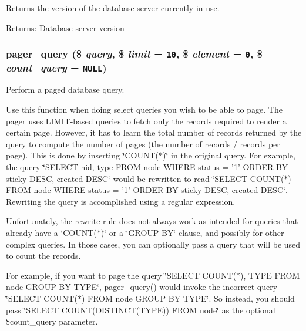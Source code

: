 Returns the version of the database server currently in use.

\begin{Desc}
\item[Returns:]Database server version \end{Desc}
\hypertarget{group__database_ge456e13108bb88fa7a532e1cccdeaa50}{
\subsubsection[{pager\_\-query}]{\setlength{\rightskip}{0pt plus 5cm}pager\_\-query (\$ {\em query}, \/  \$ {\em limit} = {\tt 10}, \/  \$ {\em element} = {\tt 0}, \/  \$ {\em count\_\-query} = {\tt NULL})}}
\label{group__database_ge456e13108bb88fa7a532e1cccdeaa50}


Perform a paged database query.

Use this function when doing select queries you wish to be able to page. The pager uses LIMIT-based queries to fetch only the records required to render a certain page. However, it has to learn the total number of records returned by the query to compute the number of pages (the number of records / records per page). This is done by inserting \char`\"{}COUNT($\ast$)\char`\"{} in the original query. For example, the query \char`\"{}SELECT nid, type FROM node WHERE status = '1' ORDER BY sticky DESC, created DESC\char`\"{} would be rewritten to read \char`\"{}SELECT COUNT($\ast$) FROM node WHERE status = '1' ORDER BY sticky DESC, created DESC\char`\"{}. Rewriting the query is accomplished using a regular expression.

Unfortunately, the rewrite rule does not always work as intended for queries that already have a \char`\"{}COUNT($\ast$)\char`\"{} or a \char`\"{}GROUP BY\char`\"{} clause, and possibly for other complex queries. In those cases, you can optionally pass a query that will be used to count the records.

For example, if you want to page the query \char`\"{}SELECT COUNT($\ast$), TYPE FROM node GROUP BY TYPE\char`\"{}, \hyperlink{group__database_ge456e13108bb88fa7a532e1cccdeaa50}{pager\_\-query()} would invoke the incorrect query \char`\"{}SELECT COUNT($\ast$) FROM node GROUP BY TYPE\char`\"{}. So instead, you should pass \char`\"{}SELECT COUNT(DISTINCT(TYPE)) FROM node\char`\"{} as the optional \$count\_\-query parameter.

